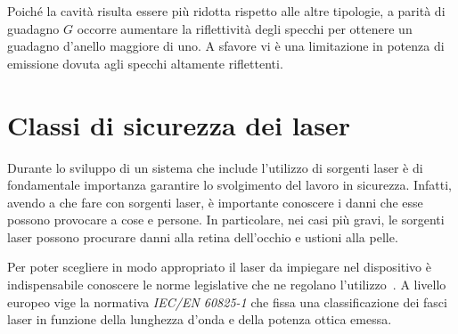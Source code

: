 Poiché la cavità risulta essere più ridotta rispetto alle altre tipologie, a parità di guadagno $G$ occorre aumentare la riflettività degli specchi per ottenere un guadagno d'anello maggiore di uno. A sfavore vi è una limitazione in potenza di emissione dovuta agli specchi altamente riflettenti.

\section{Classi di sicurezza dei laser}
Durante lo sviluppo di un sistema che include l'utilizzo di sorgenti laser è di fondamentale importanza garantire lo svolgimento del lavoro in sicurezza. Infatti, avendo a che fare con sorgenti laser, è importante conoscere i danni che esse possono provocare a cose e persone. In particolare, nei casi più gravi, le sorgenti laser possono procurare danni alla retina dell'occhio e ustioni alla pelle. 

Per poter scegliere in modo appropriato il laser da impiegare nel dispositivo è indispensabile conoscere le norme legislative che ne regolano l'utilizzo~\cite{ans}. A livello europeo vige la normativa \emph{IEC/EN 60825-1} che fissa una classificazione dei fasci laser in funzione della lunghezza d'onda e della potenza ottica emessa. 

